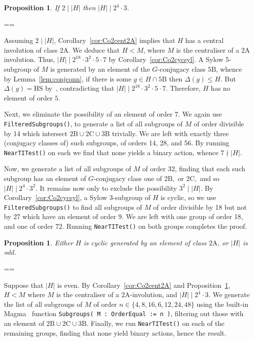 \documentclass[11pt, a4paper]{amsart}
\makeatletter
\newcommand{\magma}{{\sc Magma}}
\newtheorem{prop}[thm]{Proposition}
\renewcommand{\proofname}{Proof}
\renewenvironment{proof}[1][\proofname]{\par
  \pushQED{\qed}  \normalfont \partopsep=\z@skip \topsep=\z@skip
  \trivlist
  \item[\hskip\labelsep
        \scshape
    #1\@addpunct{.}]\ignorespaces
}{  \popQED\endtrivlist\@endpefalse
}
\makeatother
\begin{document}
\begin{prop}\label{prop:Co2bigorderreduction}
    If $2\mid|H|$ then $|H|\mid 2^{4}\cdot3$.
\end{prop}
\begin{proof}
    Assuming $2\mid |H|$, Corollary~\ref{cor:Co2cent2A} implies that $H$ has a central involution of class $\mathrm{2A}$. We deduce that $H<M$, where $M$ is the centraliser of a $\mathrm{2A}$ involution. Thus, $|H|\mid 2^{18}\cdot 3^2\cdot5\cdot7$ by Corollary~\ref{cor:Co2cycsyl}. A Sylow 5-subgroup of $M$ is generated by an element of the $G$-conjugacy class $\mathrm{5B}$, whence by Lemma~\ref{lem:conjconn}, if there is some $g\in H\cap \mathrm{5B}$ then $\Delta(g)\leq H$. But $\Delta(g)=\mathrm{HS}$ by~\cite[Proposition 3.3]{CDP}, contradicting that $|H|\mid 2^{18}\cdot 3^2\cdot5\cdot7$. Therefore, $H$ has no element of order $5$.

    Next, we eliminate the possibility of an element of order 7. We again use {\tt{FilteredSubgroups()}}, to generate a list of all subgroups of $M$ of order divisible by 14 which intersect $\mathrm{2B}\cup\mathrm{2C}\cup\mathrm{3B}$ trivially. We are left with exactly three (conjugacy classes of) such subgroups, of orders 14, 28, and 56. By running {\tt{NearTITest()}} on each we find that none yields a binary action, whence $7\nmid |H|$.

    Now, we generate a list of all subgroups of $M$ of order $32$, finding that each such subgroup has an element of $G$-conjugacy class one of $\mathrm{2B},$ or $\mathrm{2C},$ and so $|H|\mid 2^4\cdot 3^2$. It remains now only to exclude the possibility $3^2\mid |H|$.   By Corollary~\ref{cor:Co2cycsyl}, a Sylow 3-subgroup of $H$ is cyclic, so we use {\tt{FilteredSubgroups()}} to find all subgroups of $M$ of order divisible by 18 but not by 27 which have an element of order 9. We are left with one group of order 18, and one of order 72. Running {\tt{NearTITest()}} on both groups completes the proof.
\end{proof}
\begin{prop}\label{prop:co2oddred}
    Either $H$ is cyclic generated by an element of class $\mathrm{2A}$, or $|H|$ is odd.
\end{prop}
\begin{proof}
    Suppose that $|H|$ is even. By Corollary~\ref{cor:Co2cent2A} and Proposition~\ref{prop:Co2bigorderreduction}, $H<M$ where $M$ is the centraliser of a $\mathrm{2A}$-involution, and $|H|\mid 2^4\cdot 3$. We generate the list of all subgroups of $M$ of order $n\in\{4,8,16,6,12,24,48\}$ using the built-in \magma~\cite{magma} function {\nolinebreak\tt{Subgroups( M : OrderEqual := n )}}, filtering out those with an element of $\mathrm{2B}\cup\mathrm{2C}\cup\mathrm{3B}$. Finally, we run {\tt{NearTITest()}} on each of the remaining groups, finding that none yield binary actions, hence the result.
\end{proof}
\end{document}
